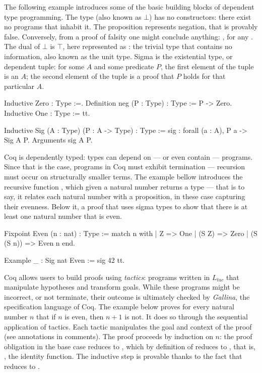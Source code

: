 \documentclass{mproj}
\begin{document}
The following example introduces some of the basic building blocks of dependent type programming. The type  (also known as $\bot$) has no constructors: there exist no programs that inhabit it. The proposition  represents negation, that  is provably false. Conversely, from a proof of falsity one might conclude anything: , for any . The dual of $\bot$ is $\top$, here represented as : the trivial type that contains no information, also known as the unit type. Sigma is the existential type, or dependent tuple: for some $A$ and some predicate $P$, the first element of the tuple is an $A$; the second element of the tuple is a proof that $P$ holds for that particular $A$.

\begin{coq}
Inductive Zero : Type :=.
Definition neg (P : Type) : Type := P -> Zero.
Inductive One : Type := tt.

Inductive Sig (A : Type) (P : A -> Type) : Type :=
  sig : forall (a : A), P a -> Sig A P.
Arguments sig {A P}.
\end{coq}

Coq is dependently typed: types can depend on --- or even contain --- programs. Since that is the case, programs in Coq must exhibit termination --- recursion must occur on structurally smaller terms. The example bellow introduces the recursive function , which given a natural number returns a type --- that is to say, it relates each natural number with a proposition, in these case capturing their evenness. Below it, a proof that uses sigma types to show that there is at least one natural number that is even.

\begin{coq}
Fixpoint Even (n : nat) : Type :=
  match n with
  | Z         => One
  | (S Z)     => Zero
  | (S (S n)) => Even n
  end.

Example _ : Sig nat Even := sig 42 tt.
\end{coq}

Coq allows users to build proofs using \emph{tactics}: programs written in $L_{tac}$ that manipulate hypotheses and transform goals. While these programs might be incorrect, or not terminate, their outcome is ultimately checked by \emph{Gallina}, the specification language of Coq. The example below proves for every natural number $n$ that if $n$ is even, then $n+1$ is not. It does so through the sequential application of tactics. Each tactic manipulates the goal and context of the proof (see annotations in comments). The proof proceeds by induction on $n$: the proof obligation in the base case reduces to , which by definition of  reduces to , that is, , the identity function. The inductive step is provable thanks to the fact that  reduces to .
\end{document}
